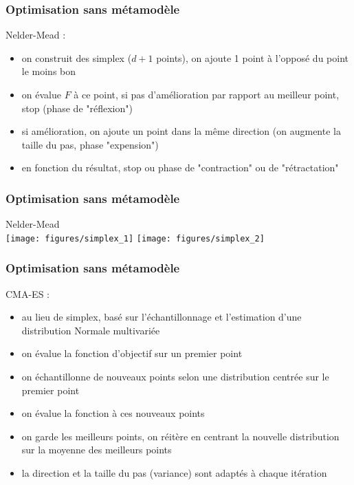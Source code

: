 \documentclass[10pt]{beamer}
\begin{document}
\begin{frame}
\frametitle{Optimisation sans métamodèle}

Nelder-Mead :
\begin{itemize}
	\item on construit des simplex ($ d+1 $ points), on ajoute 1 point à l'opposé du point le moins bon
	\item on évalue $ F $ à ce point, si pas d'amélioration par rapport au meilleur point, stop (phase de "réflexion")
	\item si amélioration, on ajoute un point dans la même direction (on augmente la taille du pas, phase "expension")
	\item en fonction du résultat, stop ou phase de "contraction" ou de "rétractation"
\end{itemize}

\end{frame}

\begin{frame}
\frametitle{Optimisation sans métamodèle}

Nelder-Mead\\

\centering
\texttt{[image: figures/simplex\_1]}
\texttt{[image: figures/simplex\_2]}

\end{frame}

\begin{frame}
\frametitle{Optimisation sans métamodèle}

CMA-ES :
\begin{itemize}
	\item au lieu de simplex, basé sur l'échantillonnage et l'estimation d'une distribution Normale multivariée
	\item on évalue la fonction d'objectif sur un premier point
	\item on échantillonne de nouveaux points selon une distribution centrée sur le premier point
	\item on évalue la fonction à ces nouveaux points
	\item on garde les meilleurs points, on réitère en centrant la nouvelle distribution sur la moyenne des meilleurs points
	\item la direction et la taille du pas (variance) sont adaptés à chaque itération
\end{itemize}

\end{frame}
\end{document}
